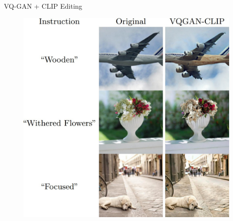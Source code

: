 \begin{frame}[allowframebreaks]{VQ-GAN + CLIP Editing}
\framebreak
    \begin{figure}
        \centering
        \includegraphics[width=1\textwidth,height=0.9\textheight,keepaspectratio]{images/video/slide_64_1_img.jpg}
    \end{figure}
\end{frame}